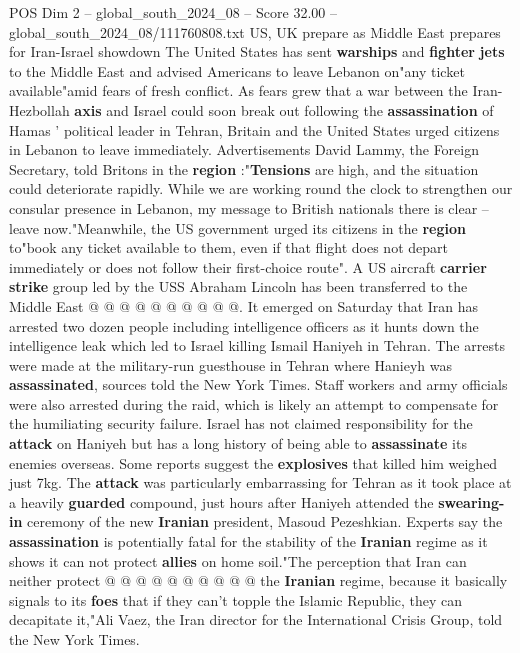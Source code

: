 \begin{textsample}{POS Dim 2 – global\_south\_2024\_08 – Score 32.00 – global\_south\_2024\_08/111760808.txt}  \label{ex:f2_pos_005}
US, UK prepare as Middle East prepares for Iran-Israel showdown The United States has sent \textbf{warships} and \textbf{fighter} \textbf{jets} to the Middle East and advised Americans to leave Lebanon on"any ticket available"amid fears of fresh conflict.
As fears grew that a war between the Iran-Hezbollah \textbf{axis} and Israel could soon break out following the \textbf{assassination} of Hamas ' political leader in Tehran, Britain and the United States urged citizens in Lebanon to leave immediately.
Advertisements David Lammy, the Foreign Secretary, told Britons in the \textbf{region} :"\textbf{Tensions} are high, and the situation could deteriorate rapidly.
While we are working round the clock to strengthen our consular presence in Lebanon, my message to British nationals there is clear -- leave now."Meanwhile, the US government urged its citizens in the \textbf{region} to"book any ticket available to them, even if that flight does not depart immediately or does not follow their first-choice route".
A US aircraft \textbf{carrier} \textbf{strike} group led by the USS Abraham Lincoln has been transferred to the Middle East @ @ @ @ @ @ @ @ @ @.
It emerged on Saturday that Iran has arrested two dozen people including intelligence officers as it hunts down the intelligence leak which led to Israel killing Ismail Haniyeh in Tehran.
The arrests were made at the military-run guesthouse in Tehran where Hanieyh was \textbf{assassinated}, sources told the New York Times.
Staff workers and army officials were also arrested during the raid, which is likely an attempt to compensate for the humiliating security failure.
Israel has not claimed responsibility for the \textbf{attack} on Haniyeh but has a long history of being able to \textbf{assassinate} its enemies overseas.
Some reports suggest the \textbf{explosives} that killed him weighed just 7kg.
The \textbf{attack} was particularly embarrassing for Tehran as it took place at a heavily \textbf{guarded} compound, just hours after Haniyeh attended the \textbf{swearing-in} ceremony of the new \textbf{Iranian} president, Masoud Pezeshkian.
Experts say the \textbf{assassination} is potentially fatal for the stability of the \textbf{Iranian} regime as it shows it can not protect \textbf{allies} on home soil."The perception that Iran can neither protect @ @ @ @ @ @ @ @ @ @ the \textbf{Iranian} regime, because it basically signals to its \textbf{foes} that if they can't topple the Islamic Republic, they can decapitate it,"Ali Vaez, the Iran director for the International Crisis Group, told the New York Times.

\end{textsample}
